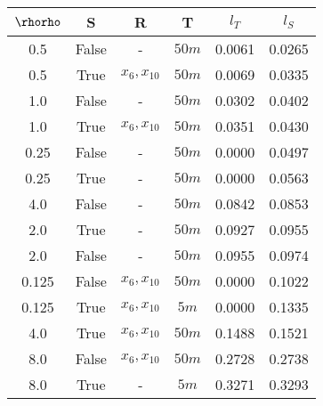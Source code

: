 \begin{tabular}{| c c | c c | c c |}
\hline
$\rhorho$ & S & R & T & $l_T$ & $l_S$ \\
\hline
0.5 & False & - & $50m$ & 0.0061 & 0.0265 \\
0.5 & True & $x_{6}, x_{10}$ & $50m$ & 0.0069 & 0.0335 \\
1.0 & False & - & $50m$ & 0.0302 & 0.0402 \\
1.0 & True & $x_{6}, x_{10}$ & $50m$ & 0.0351 & 0.0430 \\
0.25 & False & - & $50m$ & 0.0000 & 0.0497 \\
0.25 & True & - & $50m$ & 0.0000 & 0.0563 \\
4.0 & False & - & $50m$ & 0.0842 & 0.0853 \\
2.0 & True & - & $50m$ & 0.0927 & 0.0955 \\
2.0 & False & - & $50m$ & 0.0955 & 0.0974 \\
0.125 & False & $x_{6}, x_{10}$ & $50m$ & 0.0000 & 0.1022 \\
0.125 & True & $x_{6}, x_{10}$ & $5m$ & 0.0000 & 0.1335 \\
4.0 & True & $x_{6}, x_{10}$ & $50m$ & 0.1488 & 0.1521 \\
8.0 & False & $x_{6}, x_{10}$ & $50m$ & 0.2728 & 0.2738 \\
8.0 & True & - & $5m$ & 0.3271 & 0.3293 \\
\hline
\end{tabular}
